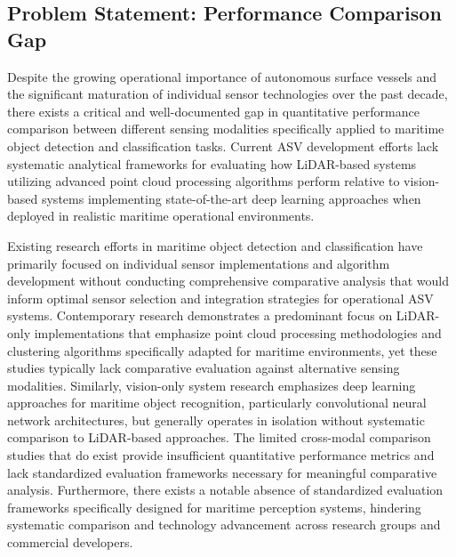 \documentclass{erauthesis}
\begin{document}
\subsection{Problem Statement: Performance Comparison Gap}

Despite the growing operational importance of autonomous surface vessels and the significant maturation of individual sensor technologies over the past decade, there exists a critical and well-documented gap in quantitative performance comparison between different sensing modalities specifically applied to maritime object detection and classification tasks. Current \ac{ASV} development efforts lack systematic analytical frameworks for evaluating how \ac{LiDAR}-based systems utilizing advanced point cloud processing algorithms perform relative to vision-based systems implementing state-of-the-art deep learning approaches when deployed in realistic maritime operational environments.

Existing research efforts in maritime object detection and classification have primarily focused on individual sensor implementations and algorithm development without conducting comprehensive comparative analysis that would inform optimal sensor selection and integration strategies for operational \ac{ASV} systems. Contemporary research demonstrates a predominant focus on \ac{LiDAR}-only implementations that emphasize point cloud processing methodologies and clustering algorithms specifically adapted for maritime environments, yet these studies typically lack comparative evaluation against alternative sensing modalities. Similarly, vision-only system research emphasizes deep learning approaches for maritime object recognition, particularly convolutional neural network architectures, but generally operates in isolation without systematic comparison to \ac{LiDAR}-based approaches. The limited cross-modal comparison studies that do exist provide insufficient quantitative performance metrics and lack standardized evaluation frameworks necessary for meaningful comparative analysis. Furthermore, there exists a notable absence of standardized evaluation frameworks specifically designed for maritime perception systems, hindering systematic comparison and technology advancement across research groups and commercial developers.
\end{document}
